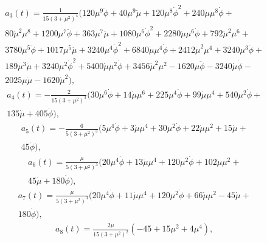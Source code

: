 \documentclass{article}
\begin{document}
\begin{eqnarray}\label{a3}
    &&a_{3}(t) = \frac{1}{15(3+\mu^{2})^{4}}(120 \mu ^9 \ddot{\phi }+40 \mu ^9 \ddot{\mu }+120 \mu ^8 \dot{\phi }^2+240 \dot{\mu } \mu ^8 \dot{\phi }+ \nonumber\\
    && 80 \dot{\mu }^2 \mu ^8+1200 \mu ^7 \ddot{\phi }+363 \mu ^7 \ddot{\mu }+1080 \mu ^6 \dot{\phi}^2+2280 \dot{\mu } \mu ^6 \dot{\phi }+792 \dot{\mu }^2 \mu ^6+\nonumber\\
    &&3780 \mu ^5 \ddot{\phi } + 1017 \mu ^5 \ddot{\mu }+3240 \mu ^4 \dot{\phi }^2+6840 \dot{\mu } \mu ^4 \dot{\phi }+2412 \dot{\mu }^2 \mu^4+3240 \mu ^3 \ddot{\phi }+\nonumber\\
    &&189 \mu ^3 \ddot{\mu }+3240 \mu ^2 \dot{\phi }^2+5400 \dot{\mu } \mu ^2 \dot{\phi }+3456 \dot{\mu }^2 \mu ^2-1620 \mu  \ddot{\phi }-3240 \dot{\mu } \dot{\phi }- \nonumber\\
    &&2025 \mu \ddot{\mu } -1620 \dot{\mu }^2),
\end{eqnarray}
\begin{eqnarray}\label{a4}
    &&a_{4}(t) = - \frac{2}{15(3+\mu^{2})^{3}} (30 \mu ^6 \dot{\phi }+14 \dot{\mu } \mu ^6+225 \mu ^4 \dot{\phi }+99 \dot{\mu } \mu ^4+540 \mu ^2 \dot{\phi }+\nonumber\\
    &&135 \dot{\mu }+405 \dot{\phi }),
\end{eqnarray}
\begin{eqnarray}\label{a5}
    &&a_{5}(t) = -\frac{6}{5(3+\mu^{2})^{3}} (5 \mu ^4 \dot{\phi }+3 \dot{\mu } \mu ^4+30 \mu ^2 \dot{\phi }+22 \dot{\mu } \mu ^2+15 \dot{\mu }+\nonumber\\
    &&45 \dot{\phi }),
\end{eqnarray}
\begin{eqnarray}\label{a6}
    &&a_{6}(t) = \frac{\mu}{5(3+\mu^{2})^{3}} (20 \mu ^4 \dot{\phi }+13 \dot{\mu } \mu ^4+120 \mu ^2 \dot{\phi }+102 \dot{\mu } \mu ^2 + \nonumber\\
    &&45 \dot{\mu }+180 \dot{\phi }),
\end{eqnarray}
\begin{eqnarray}\label{a7}
    &&a_{7}(t) = \frac{\mu}{5(3+\mu^{2})^{3}} (20 \mu ^4 \dot{\phi }+11 \dot{\mu } \mu ^4+120 \mu ^2 \dot{\phi }+66 \dot{\mu } \mu ^2-45 \dot{\mu } + \nonumber\\
    &&180 \dot{\phi }),
\end{eqnarray}
\begin{eqnarray}\label{a8}
    &&a_{8}(t) = \frac{2\mu}{15(3+\mu^{2})^{2}} (-45 + 15\mu^{2} + 4 \mu^{4}),
\end{eqnarray}
\end{document}
